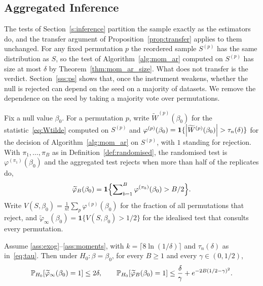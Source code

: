 \subsection{Aggregated Inference}

The tests of Section~\ref{s:inference} partition the sample exactly as the estimators do, and the transfer argument of Proposition~\ref{prop:transfer} applies to them unchanged. For any fixed permutation $p$ the reordered sample $S^{(p)}$ has the same distribution as $S$, so the test of Algorithm~\ref{alg:mom_ar} computed on $S^{(p)}$ has size at most $\delta$ by Theorem~\ref{thm:mom_ar_size}. What does not transfer is the verdict. Section~\ref{sss:ps} shows that, once the instrument weakens, whether the null is rejected can depend on the seed on a majority of datasets. We remove the dependence on the seed by taking a majority vote over permutations.


\begin{definition}
\label{def:randomised_test}
    Fix a null value $\beta_0$. For a permutation $p$, write $\widetilde{W}^{(p)}(\beta_0)$ for the statistic~\eqref{eq:Wtilde} computed on $S^{(p)}$ and $\varphi^{(p)}(\beta_0) = \mathbf{1}\{\left|\widetilde{W}^{(p)}(\beta_0)\right| > \tau_n(\delta)\}$ for the decision of Algorithm~\ref{alg:mom_ar} on $S^{(p)}$, with $1$ standing for rejection. With $\pi_1,\dots,\pi_B$ as in Definition~\ref{def:randomised}, the randomised test is $\varphi^{(\pi_1)}(\beta_0)$ and the aggregated test rejects when more than half of the replicates do,
    \begin{equation}
    \label{eq:agg_test}
        \widetilde{\varphi}_B(\beta_0)
        = \mathbf{1}\Bigl\{\sum\nolimits_{b=1}^{B} \varphi^{(\pi_b)}(\beta_0) > B/2\Bigr\}.
    \end{equation}
    Write $V(S,\beta_0) = \frac{1}{n!}\sum_{p}\varphi^{(p)}(\beta_0)$ for the fraction of all permutations that reject, and $\widetilde{\varphi}_\infty(\beta_0) = \mathbf{1}\{V(S,\beta_0) > 1/2\}$ for the idealised test that consults every permutation.
\end{definition}

\begin{theorem}
\label{thm:agg_size}
    Assume \ref{ass:exog}--\ref{ass:moments}, with $k = \lceil 8\ln(1/\delta)\rceil$ and $\tau_n(\delta)$ as in~\eqref{eq:tau}. Then under $H_0\colon\beta=\beta_0$, for every $B \geq 1$ and every $\gamma \in (0,1/2)$,
    \begin{equation}
    \label{eq:agg_size}
        \operatorname{\mathbb{P}}_{H_0}\!\left[\widetilde{\varphi}_\infty(\beta_0) = 1\right] \leq 2\delta,
        \qquad
        \operatorname{\mathbb{P}}_{H_0}\!\left[\widetilde{\varphi}_B(\beta_0) = 1\right] \leq \frac{\delta}{\gamma} + e^{-2B(1/2-\gamma)^2}.
    \end{equation}
\end{theorem}


